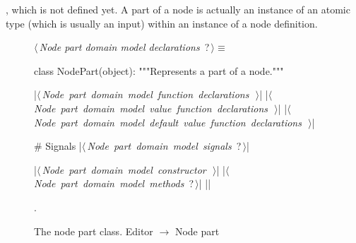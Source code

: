 \documentclass[%
    a4paper,    %
    justified,  %
    nobib,      %
    openany     %
]{tufte-book}
\begin{document}
,
which is not defined yet. A part of a node is actually an instance of an atomic
type (which is usually an input) within an instance of a node definition.

\begin{figure}
\begin{flushleft} \small
\begin{minipage}{\linewidth}\label{scrap115}\raggedright\small
{} $\langle\,${\itshape Node part domain model declarations}\nobreak\ {\footnotesize {?}}$\,\rangle\equiv$
\vspace{-1ex}
\begin{pythoncode}
class NodePart(object):
    """Represents a part of a node."""

    |\hbox{$\langle\,${\itshape Node part domain model function declarations}\nobreak\ {\footnotesize {}}$\,\rangle$}|
    |\hbox{$\langle\,${\itshape Node part domain model value function declarations}\nobreak\ {\footnotesize {}}$\,\rangle$}|
    |\hbox{$\langle\,${\itshape Node part domain model default value function declarations}\nobreak\ {\footnotesize {}}$\,\rangle$}|

    # Signals
    |\hbox{$\langle\,${\itshape Node part domain model signals}\nobreak\ {\footnotesize ?}$\,\rangle$}|

    |\hbox{$\langle\,${\itshape Node part domain model constructor}\nobreak\ {\footnotesize {}}$\,\rangle$}|
    |\hbox{$\langle\,${\itshape Node part domain model methods}\nobreak\ {\footnotesize ?}$\,\rangle$}|
|\NWsep|
\end{pythoncode}
\vspace{1.5ex}
\footnotesize
\begin{list}{}{\setlength{\itemsep}{-\parsep}\setlength{\itemindent}{-\leftmargin}}
\item {\NWtxtMacroNoRef}.

\item{}
\end{list}
\end{minipage}\vspace{4ex}
\end{flushleft}
\caption{The node part class.
  \newline{}\newline{}Editor $\rightarrow$ Node part}
\label{editor:lst:node-part}
\end{figure}
\end{document}
